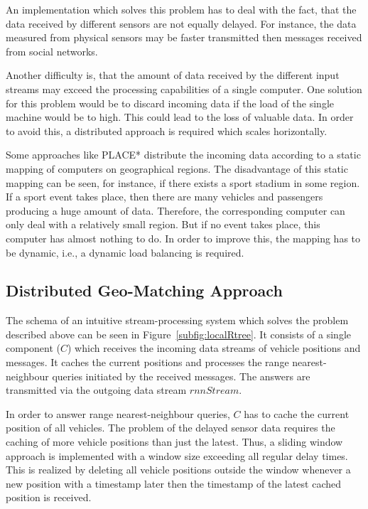An implementation which solves this problem has to deal with the fact,
that the data received by different sensors are not equally
delayed. For instance, the data measured from physical sensors may be
faster transmitted then messages received from social networks.

Another difficulty is, that the amount of data received by the
different input streams may exceed the processing capabilities of a
single computer. One solution for this problem would be to discard
incoming data if the load of the single machine would be to high. This
could lead to the loss of valuable data. In order to avoid this, a
distributed approach is required which scales horizontally.

Some approaches like PLACE* \cite{Xiong2007PAD} distribute the
incoming data according to a static mapping of computers on
geographical regions. The disadvantage of this static mapping can be
seen, for instance, if there exists a sport stadium in some region. If
a sport event takes place, then there are many vehicles and passengers
producing a huge amount of data. Therefore, the corresponding computer
can only deal with a relatively small region. But if no event takes
place, this computer has almost nothing to do. In order to improve
this, the mapping has to be dynamic, i.e., a dynamic load balancing is
required.

\subsection{Distributed Geo-Matching Approach}\label{sec:approach}

The schema of an intuitive stream-processing system which solves the
problem described above can be seen in
Figure~\ref{subfig:localRtree}. It consists of a single component
($C$) which receives the incoming data streams of vehicle positions
and messages. It caches the current positions and processes the range
nearest-neighbour queries initiated by the received messages. The
answers are transmitted via the outgoing data stream $rnnStream$.

In order to answer range nearest-neighbour queries, $C$ has to cache
the current position of all vehicles. The problem of the delayed
sensor data requires the caching of more vehicle positions than just
the latest. Thus, a sliding window approach is implemented with a
window size exceeding all regular delay times. This is realized by
deleting all vehicle positions outside the window whenever a new
position with a timestamp later then the timestamp of the latest
cached position is received.

